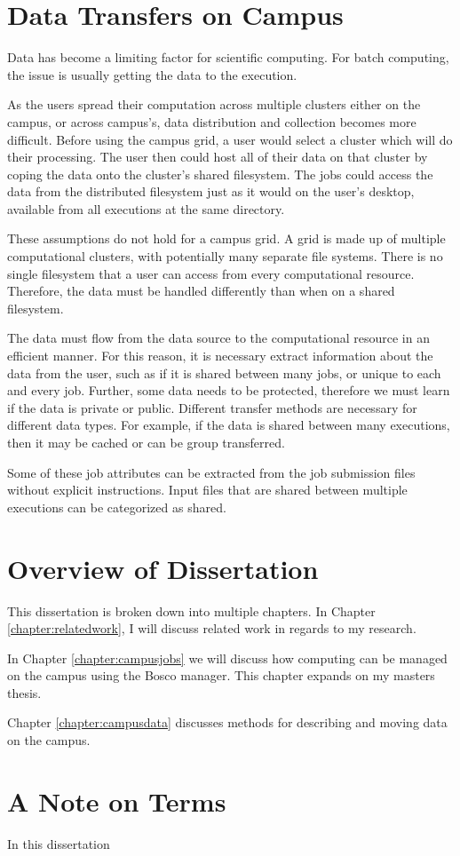\section{Data Transfers on Campus}

Data has become a limiting factor for scientific computing.  For batch computing, the issue is usually getting the data to the execution.  

As the users spread their computation across multiple clusters either on the campus, or across campus's, data distribution and collection becomes more difficult.  Before using the campus grid, a user would select a cluster which will do their processing.  The user then could host all of their data on that cluster by coping the data onto the cluster's shared filesystem.  The jobs could access the data from the distributed filesystem just as it would on the user's desktop, available from all executions at the same directory.


These assumptions do not hold for a campus grid.  A grid is made up of multiple computational clusters, with potentially many separate file systems.  There is no single filesystem that a user can access from every computational resource.  Therefore, the data must be handled differently than when on a shared filesystem.  

The data must flow from the data source to the computational resource in an efficient manner.  For this reason, it is necessary extract information about the data from the user, such as if it is shared between many jobs, or unique to each and every job.  Further, some data needs to be protected, therefore we must learn if the data is private or public.  Different transfer methods are necessary for different data types.  For example, if the data is shared between many executions, then it may be cached or can be group transferred.  

Some of these job attributes can be extracted from the job submission files without explicit instructions.  Input files that are shared between multiple executions can be categorized as shared.


\section{Overview of Dissertation}

This dissertation is broken down into multiple chapters.  In Chapter \ref{chapter:relatedwork}, I will discuss related work in regards to my research.  

In Chapter \ref{chapter:campusjobs} we will discuss how computing can be managed on the campus using the Bosco manager.  This chapter expands on my masters thesis.

Chapter \ref{chapter:campusdata} discusses methods for describing and moving data on the campus.  



\section{A Note on Terms}

In this dissertation 

